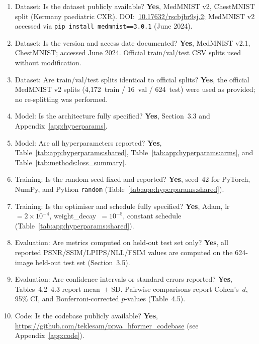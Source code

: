 \documentclass[12pt, a4paper, twoside, openright]{book}
\begin{document}
\begin{appendices}

\begin{enumerate}
  \item Dataset: Is the dataset publicly available? \textbf{Yes}, MedMNIST v2, ChestMNIST split (Kermany paediatric CXR). DOI:~\href{https://doi.org/10.17632/rscbjbr9sj.2}{10.17632/rscbjbr9sj.2}; MedMNIST v2 accessed via \texttt{pip install medmnist==3.0.1} (June 2024).
  \item Dataset: Is the version and access date documented? \textbf{Yes}, MedMNIST v2.1, ChestMNIST; accessed June 2024. Official train/val/test CSV splits used without modification.
  \item Dataset: Are train/val/test splits identical to official splits? \textbf{Yes}, the official MedMNIST v2 splits (4,172~train / 16~val / 624~test) were used as provided; no re-splitting was performed.
  \item Model: Is the architecture fully specified? \textbf{Yes}, Section~3.3 and Appendix~\ref{app:hyperparams}.
  \item Model: Are all hyperparameters reported? \textbf{Yes}, Table~\ref{tab:app:hyperparams:shared}, Table~\ref{tab:app:hyperparams:arms}, and Table~\ref{tab:methods:loss_summary}.
  \item Training: Is the random seed fixed and reported? \textbf{Yes}, seed~42 for PyTorch, NumPy, and Python \texttt{random} (Table~\ref{tab:app:hyperparams:shared}).
  \item Training: Is the optimiser and schedule fully specified? \textbf{Yes}, Adam, lr~$=2\times10^{-4}$, weight\_decay~$=10^{-5}$, constant schedule (Table~\ref{tab:app:hyperparams:shared}).
  \item Evaluation: Are metrics computed on held-out test set only? \textbf{Yes}, all reported PSNR/SSIM/LPIPS/NLL/FSIM values are computed on the 624-image held-out test set (Section~3.5).
  \item Evaluation: Are confidence intervals or standard errors reported? \textbf{Yes}, Tables~4.2--4.3 report mean~$\pm$ SD. Pairwise comparisons report Cohen's~$d$, 95\% CI, and Bonferroni-corrected $p$-values (Table~4.5).
  \item Code: Is the codebase publicly available? \textbf{Yes}, \url{https://github.com/teklesam/ppva_hformer_codebase} (see Appendix~\ref{app:code}).
\end{enumerate}


\end{appendices}
\end{document}
